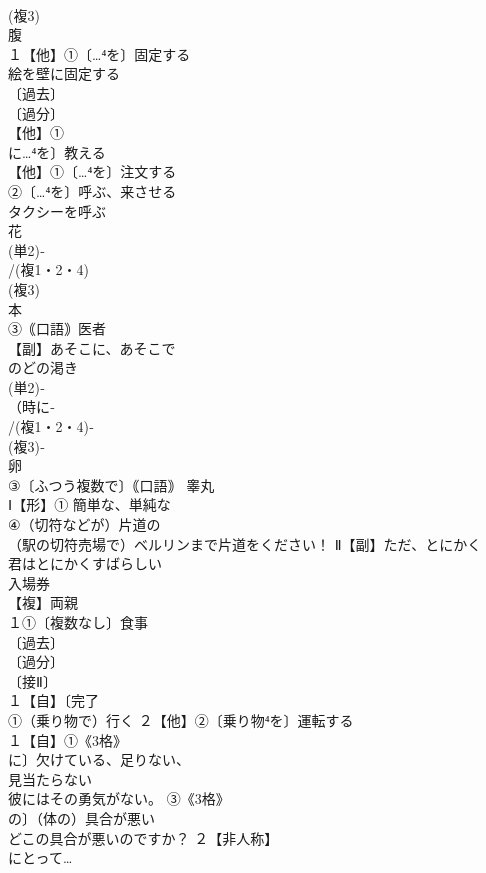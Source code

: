 \documentclass[8pt]{extreport}
\begin{document}
\begin{CJK}{UTF8}{min}
\\	(複3)
\\	腹
\\	１【他】①〔…⁴を〕固定する 
\\	絵を壁に固定する
\\	〔過去〕
\\	〔過分〕
\\	【他】①
\\	に…⁴を〕教える
\\	【他】①〔…⁴を〕注文する 
\\	②〔…⁴を〕呼ぶ、来させる 
\\	タクシーを呼ぶ
\\	花
\\	(単2)‐
\\	/(複1・2・4)
\\	(複3)
\\	本 
\\	③｟口語｠医者
\\	【副】あそこに、あそこで
\\	のどの渇き
\\	(単2)‐
\\	（時に‐
\\	/(複1・2・4)‐
\\	(複3)‐
\\	卵
\\	③〔ふつう複数で〕｟口語｠ 睾丸
\\	Ⅰ【形】① 簡単な、単純な
\\	④（切符などが）片道の 
\\	（駅の切符売場で）ベルリンまで片道をください！ Ⅱ【副】ただ、とにかく 
\\	君はとにかくすばらしい
\\	入場券
\\	【複】両親 
\\	１①〔複数なし〕食事
\\	〔過去〕
\\	〔過分〕
\\	〔接Ⅱ〕
\\	１【自】〔完了
\\	①（乗り物で）行く ２【他】②〔乗り物⁴を〕運転する
\\	１【自】①《3格》
\\	に〕欠けている、足りない、
\\	見当たらない 
\\	彼にはその勇気がない。 ③《3格》
\\	の〕（体の）具合が悪い 
\\	どこの具合が悪いのですか？ ２【非人称】
\\	にとって…

\end{CJK}
\end{document}
